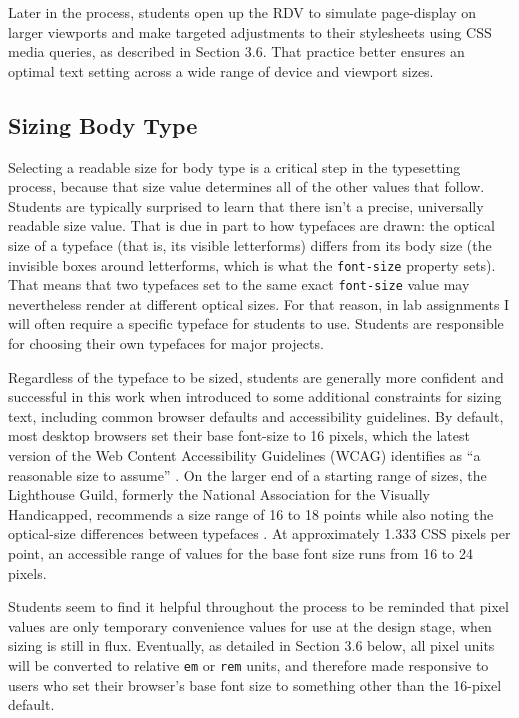 \documentclass[sigplan,screen]{acmart}
\begin{document}
Later in the process, students open up the RDV to simulate page-display on larger viewports and make targeted adjustments to their stylesheets using CSS media queries, as described in Section 3.6. That practice better ensures an optimal text setting across a wide range of device and viewport sizes.

\subsection{Sizing Body Type}

Selecting a readable size for body type is a critical step in the typesetting process, because that size value determines all of the other values that follow. Students are typically surprised to learn that there isn’t a precise, universally readable size value. That is due in part to how typefaces are drawn: the optical size of a typeface (that is, its visible letterforms) differs from its body size (the invisible boxes around letterforms, which is what the \verb|font-size| property sets). That means that two typefaces set to the same exact \verb|font-size| value may nevertheless render at different optical sizes. For that reason, in lab assignments I will often require a specific typeface for students to use. Students are responsible for choosing their own typefaces for major projects.

Regardless of the typeface to be sized, students are generally more confident and successful in this work when introduced to some additional constraints for sizing text, including common browser defaults and accessibility guidelines. By default, most desktop browsers set their base font-size to 16 pixels, which the latest version of the Web Content Accessibility Guidelines (WCAG) identifies as “a reasonable size to assume” \cite{w3c:wcag}. On the larger end of a starting range of sizes, the Lighthouse Guild, formerly the National Association for the Visually Handicapped, recommends a size range of 16 to 18 points while also noting the optical-size differences between typefaces \cite{lhg:mtl}. At approximately 1.333 CSS pixels per point, an accessible range of values for the base font size runs from 16 to 24 pixels.

Students seem to find it helpful throughout the process to be reminded that pixel values are only temporary convenience values for use at the design stage, when sizing is still in flux. Eventually, as detailed in Section 3.6 below, all pixel units will be converted to relative \verb|em| or \verb|rem| units, and therefore made responsive to users who set their browser's base font size to something other than the 16-pixel default.
\end{document}

